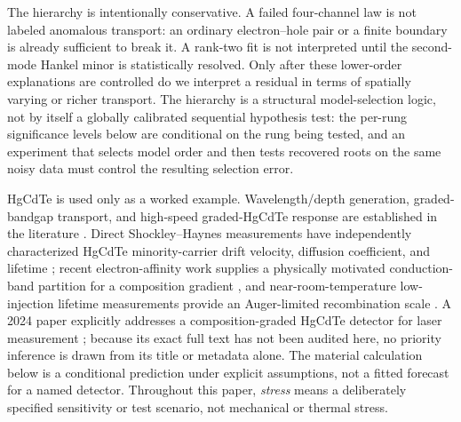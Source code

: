 \documentclass[11pt]{article}
\begin{document}
The hierarchy is intentionally conservative. A failed four-channel law is not labeled anomalous transport: an ordinary electron--hole pair or a finite boundary is already sufficient to break it. A rank-two fit is not interpreted until the second-mode Hankel minor is statistically resolved. Only after these lower-order explanations are controlled do we interpret a residual in terms of spatially varying or richer transport. The hierarchy is a structural model-selection logic, not by itself a globally calibrated sequential hypothesis test: the per-rung significance levels below are conditional on the rung being tested, and an experiment that selects model order and then tests recovered roots on the same noisy data must control the resulting selection error.

HgCdTe is used only as a worked example. Wavelength/depth generation, graded-bandgap transport, and high-speed graded-HgCdTe response are established in the literature \cite{Sang2022}. Direct Shockley--Haynes measurements have independently characterized HgCdTe minority-carrier drift velocity, diffusion coefficient, and lifetime \cite{Rothman2010}; recent electron-affinity work supplies a physically motivated conduction-band partition for a composition gradient \cite{RhigerMustafa2025}, and near-room-temperature low-injection lifetime measurements provide an Auger-limited recombination scale \cite{Kopytko2021}. A 2024 paper explicitly addresses a composition-graded HgCdTe detector for laser measurement \cite{Xu2024Laser}; because its exact full text has not been audited here, no priority inference is drawn from its title or metadata alone. The material calculation below is a conditional prediction under explicit assumptions, not a fitted forecast for a named detector. Throughout this paper, \emph{stress} means a deliberately specified sensitivity or test scenario, not mechanical or thermal stress.
\end{document}
